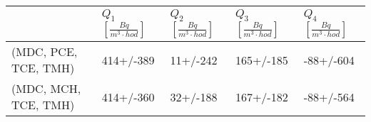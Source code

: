 \begin{tabular}{lllll}
\toprule
{} & $Q_1$ $\left[\si{\frac{Bq}{m^3\cdot hod}}\right]$ & $Q_2$ $\left[\si{\frac{Bq}{m^3\cdot hod}}\right]$ & $Q_3$ $\left[\si{\frac{Bq}{m^3\cdot hod}}\right]$ & $Q_4$ $\left[\si{\frac{Bq}{m^3\cdot hod}}\right]$ \\
\midrule
(MDC, PCE, TCE, TMH) & 414+/-389 & 11+/-242 & 165+/-185 & -88+/-604 \\
(MDC, MCH, TCE, TMH) & 414+/-360 & 32+/-188 & 167+/-182 & -88+/-564 \\
\bottomrule
\end{tabular}
